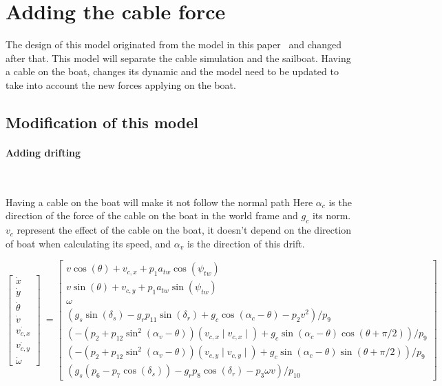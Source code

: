 \section{Adding the cable force}

The design of this model originated from the model in this paper~\cite{Jaulin2015} and changed after that.
This model will separate the cable simulation and the sailboat. Having a cable on the boat, changes its dynamic 
and the model need to be updated to take into account the new forces applying on the boat.
\subsection{Modification of this model}
\paragraph*{Adding drifting}
~\\
\hskip7mm 

Having a cable on the boat will make it not follow the normal path 
Here $\alpha_{c}$ is the direction of the force of the cable on the boat in the world frame and $g_c$ its norm.
$v_c$ represent the effect of the cable on the boat, it doesn't depend on the direction of boat when calculating its speed, and $\alpha_{v}$ is the direction of this drift. 


\begin{equation}
\begin{bmatrix}
\dot{x}\\
\dot{y}\\
\dot{\theta}\\
\dot{v}\\
\dot{v_{c,x}}\\
\dot{v_{c,y}}\\
\dot{\omega}
\end{bmatrix}\  = \begin{bmatrix}
v \cos(\theta)+v_{c,x}+p_1 a_{tw} \cos(\psi_{tw})\\
v \sin(\theta)+v_{c,y}+p_1 a_{tw} \sin(\psi_{tw})\\
\omega\\
(g_s \sin(\delta_s)-g_r p_{11} \sin(\delta_r)+ g_c \cos(\alpha_c-\theta) - p_2 v^2)/p_9\\
(-(p_2+p_{12} \sin^2(\alpha_v-\theta))(v_{c,x} \mid v_{c,x} \mid ) + g_c \sin(\alpha_{c} -\theta) \cos(\theta+\pi/2))/p_9\\
(-(p_2+p_{12} \sin^2(\alpha_v-\theta))(v_{c,y} \mid v_{c,y} \mid ) + g_c \sin(\alpha_{c} -\theta) \sin(\theta+\pi/2))/p_9\\
(g_s(p_6-p_7\cos(\delta_s))-g_r p_8 \cos(\delta_r)-p_3 \omega v)/p_{10}
\end{bmatrix}
\end{equation}

